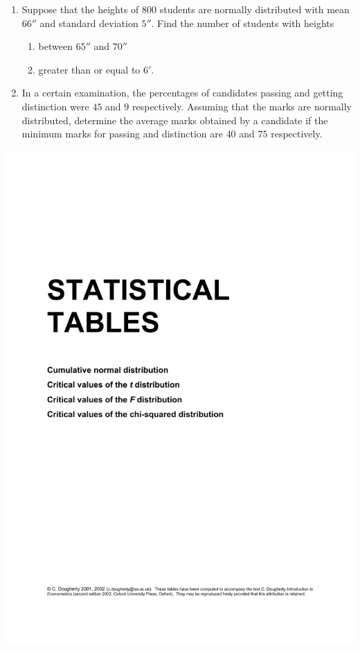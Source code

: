 \documentclass[svgnames]{amsart}
\begin{document}
\begin{enumerate}[leftmargin=*, itemsep=0.3em]
\item Suppose that the heights of $800$ students are normally distributed with mean $66''$ and standard deviation $5''$. Find the number of students with heights
\begin{enumerate}
	\item between $65''$ and $70''$
	\item greater than or equal to $6'$.
\end{enumerate}

\item In a certain examination, the percentages of candidates passing and getting distinction were $45$ and $9$ respectively. Assuming that the marks are normally distributed, determine the average marks obtained by a candidate if the minimum marks for passing and distinction are $40$ and $75$ respectively.
\end{enumerate}

\includegraphics[trim = 65 30 50 95, clip, page=2, width=\linewidth]{Statistical Tables.pdf}
\end{document}
